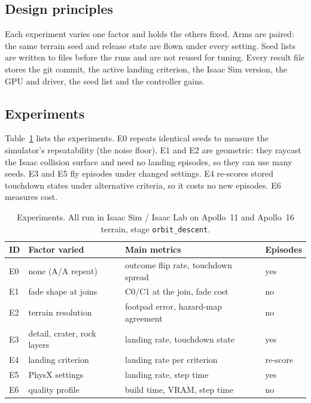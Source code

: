 \subsection{Design principles}\label{sec:principles}
Each experiment varies one factor and holds the others fixed. Arms are paired: the same terrain seed and release state are flown under every setting. Seed lists are written to files before the runs and are not reused for tuning. Every result file stores the git commit, the active landing criterion, the Isaac Sim version, the GPU and driver, the seed list and the controller gains.

\subsection{Experiments}\label{sec:experiments}
Table~\ref{tab:experiments} lists the experiments. E0 repeats identical seeds to measure the simulator's repeatability (the noise floor). E1 and E2 are geometric: they raycast the Isaac collision surface and need no landing episodes, so they can use many seeds. E3 and E5 fly episodes under changed settings. E4 re-scores stored touchdown states under alternative criteria, so it costs no new episodes. E6 measures cost.

\begin{table}[t]
\caption{Experiments. All run in Isaac Sim / Isaac Lab on Apollo~11 and Apollo~16 terrain, stage \texttt{orbit\_descent}.}\label{tab:experiments}
\begin{tabular}{@{}llll@{}}
\toprule
ID & Factor varied & Main metrics & Episodes \\
\midrule
E0 & none (A/A repeat) & outcome flip rate, touchdown spread & yes \\
E1 & fade shape at joins & C0/C1 at the join, fade cost & no \\
E2 & terrain resolution & footpad error, hazard-map agreement & no \\
E3 & detail, crater, rock layers & landing rate, touchdown state & yes \\
E4 & landing criterion & landing rate per criterion & re-score \\
E5 & PhysX settings & landing rate, step time & yes \\
E6 & quality profile & build time, VRAM, step time & no \\
\bottomrule
\end{tabular}
\end{table}

